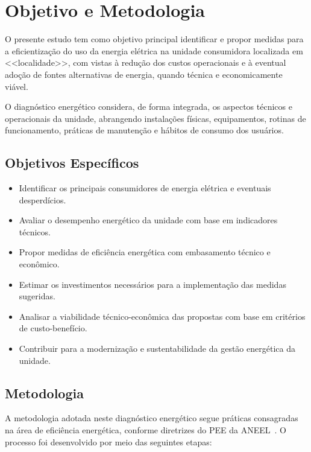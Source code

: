 \chapter{Objetivo e Metodologia}

O presente estudo tem como objetivo principal identificar e propor medidas para a eficientização do uso da energia elétrica na unidade consumidora localizada em <<localidade>>, com vistas à redução dos custos operacionais e à eventual adoção de fontes alternativas de energia, quando técnica e economicamente viável.

O diagnóstico energético considera, de forma integrada, os aspectos técnicos e operacionais da unidade, abrangendo instalações físicas, equipamentos, rotinas de funcionamento, práticas de manutenção e hábitos de consumo dos usuários.

\section{Objetivos Específicos}

\begin{itemize}
    \item Identificar os principais consumidores de energia elétrica e eventuais desperdícios.
    \item Avaliar o desempenho energético da unidade com base em indicadores técnicos.
    \item Propor medidas de eficiência energética com embasamento técnico e econômico.
    \item Estimar os investimentos necessários para a implementação das medidas sugeridas.
    \item Analisar a viabilidade técnico-econômica das propostas com base em critérios de custo-benefício.
    \item Contribuir para a modernização e sustentabilidade da gestão energética da unidade.
\end{itemize}

\section{Metodologia}

A metodologia adotada neste diagnóstico energético segue práticas consagradas na área de eficiência energética, conforme diretrizes do \ac{PEE} da \ac{ANEEL}~\cite{aneel920}. O processo foi desenvolvido por meio das seguintes etapas:

